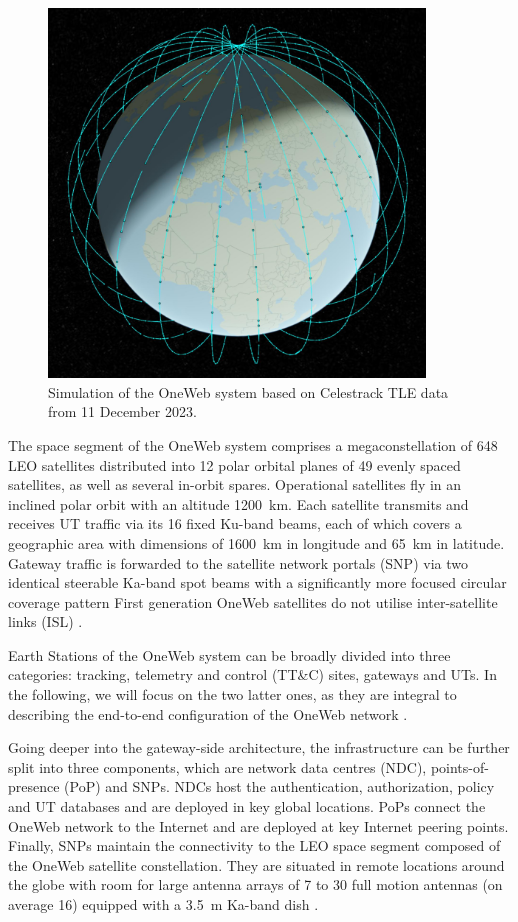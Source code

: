 \documentclass[english, 12pt, a4paper, elec, utf8, a-1b, online]{aaltothesis}
\begin{document}
\begin{figure}[h]
  \centering
  \includegraphics[width=100mm]{figures/oneweb-tle-2023-12-11-compressed.jpg}
  \caption{Simulation of the OneWeb system based on Celestrack TLE data from 11 December 2023.}
  \label{fig-oneweb-tle-2023-12-11}
\end{figure}

The space segment of the OneWeb system comprises a megaconstellation of 648 LEO satellites distributed into 12 polar orbital planes of 49 evenly spaced satellites, as well as several in-orbit spares. 
Operational satellites fly in an inclined polar orbit with an altitude \SI{1200}{\kilo\meter}.
Each satellite transmits and receives UT traffic via its 16 fixed Ku-band beams, each of which covers a geographic area with dimensions of \SI{1600}{\kilo\meter} in longitude and \SI{65}{\kilo\meter} in latitude.
Gateway traffic is forwarded to the satellite network portals (SNP) via two identical steerable Ka-band spot beams with a significantly more focused circular coverage pattern \cite{henri2020oneweb, worldvu2016loi} First generation OneWeb satellites do not utilise inter-satellite links (ISL) \cite{portillo2019technical}.

Earth Stations of the OneWeb system can be broadly divided into three categories: tracking, telemetry and control (TT\&C) sites, gateways and UTs.
In the following, we will focus on the two latter ones, as they are integral to describing the end-to-end configuration of the OneWeb network \cite{worldvu2016loi}.

Going deeper into the gateway-side architecture, the infrastructure can be further split into three components, which are network data centres (NDC), points-of-presence (PoP) and SNPs.
NDCs host the authentication, authorization, policy and UT databases and are deployed in key global locations.
PoPs connect the OneWeb network to the Internet and are deployed at key Internet peering points.
Finally, SNPs maintain the connectivity to the LEO space segment composed of the OneWeb satellite constellation.
They are situated in remote locations around the globe with room for large antenna arrays of 7 to 30 full motion antennas (on average 16) equipped with a \SI{3.5}{\meter} Ka-band dish \cite{henri2020oneweb}.
\end{document}
